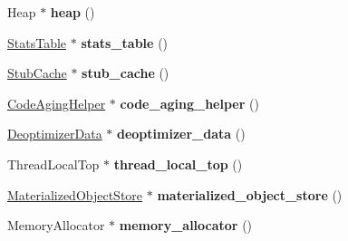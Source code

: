 \begin{DoxyCompactItemize}
\item 
\hypertarget{classv8_1_1internal_1_1_isolate_ac74a11613906581a9989b1cb7f7b3275}{}Heap $\ast$ {\bfseries heap} ()\label{classv8_1_1internal_1_1_isolate_ac74a11613906581a9989b1cb7f7b3275}

\item 
\hypertarget{classv8_1_1internal_1_1_isolate_aebeedf77fcfe6267018f09a29848c87d}{}\hyperlink{classv8_1_1internal_1_1_stats_table}{Stats\+Table} $\ast$ {\bfseries stats\+\_\+table} ()\label{classv8_1_1internal_1_1_isolate_aebeedf77fcfe6267018f09a29848c87d}

\item 
\hypertarget{classv8_1_1internal_1_1_isolate_a0c337070588fc8c637569802c1aec462}{}\hyperlink{classv8_1_1internal_1_1_stub_cache}{Stub\+Cache} $\ast$ {\bfseries stub\+\_\+cache} ()\label{classv8_1_1internal_1_1_isolate_a0c337070588fc8c637569802c1aec462}

\item 
\hypertarget{classv8_1_1internal_1_1_isolate_a99f3b94d42e561684434a2d0c5b17ac9}{}\hyperlink{classv8_1_1internal_1_1_code_aging_helper}{Code\+Aging\+Helper} $\ast$ {\bfseries code\+\_\+aging\+\_\+helper} ()\label{classv8_1_1internal_1_1_isolate_a99f3b94d42e561684434a2d0c5b17ac9}

\item 
\hypertarget{classv8_1_1internal_1_1_isolate_a5aefcc1cffaeff1dcf78f4443757d8f6}{}\hyperlink{classv8_1_1internal_1_1_deoptimizer_data}{Deoptimizer\+Data} $\ast$ {\bfseries deoptimizer\+\_\+data} ()\label{classv8_1_1internal_1_1_isolate_a5aefcc1cffaeff1dcf78f4443757d8f6}

\item 
\hypertarget{classv8_1_1internal_1_1_isolate_aa3f53c9b9733db23efd7d26d2c854409}{}Thread\+Local\+Top $\ast$ {\bfseries thread\+\_\+local\+\_\+top} ()\label{classv8_1_1internal_1_1_isolate_aa3f53c9b9733db23efd7d26d2c854409}

\item 
\hypertarget{classv8_1_1internal_1_1_isolate_a0657945ae9e24555a66d76aae9acf536}{}\hyperlink{classv8_1_1internal_1_1_materialized_object_store}{Materialized\+Object\+Store} $\ast$ {\bfseries materialized\+\_\+object\+\_\+store} ()\label{classv8_1_1internal_1_1_isolate_a0657945ae9e24555a66d76aae9acf536}

\item 
\hypertarget{classv8_1_1internal_1_1_isolate_a6f14fd4171f8688a0feb0f587cc0f159}{}Memory\+Allocator $\ast$ {\bfseries memory\+\_\+allocator} ()\label{classv8_1_1internal_1_1_isolate_a6f14fd4171f8688a0feb0f587cc0f159}


\end{DoxyCompactItemize}
